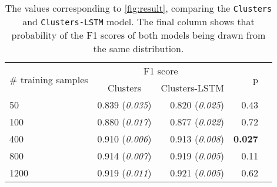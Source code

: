 \begin{table}[tb]
  \centering
  \begin{tabular}{lrrrr}
    \toprule
    \multirow{2}[3]{*}{\# training samples} & \multicolumn{2}{c}{F1 score} & \multirow{2}[3]{*}{p} \\
    \cmidrule(lr){2-3}
    & \multicolumn{1}{c}{Clusters} & \multicolumn{1}{c}{Clusters-LSTM} & \\
    \midrule
    50   & 0.839 (\emph{0.035}) & 0.820 (\emph{0.025}) & 0.43 \\
    100  & 0.880 (\emph{0.017}) & 0.877 (\emph{0.022}) & 0.72 \\
    400  & 0.910 (\emph{0.006}) & 0.913 (\emph{0.008}) & \textbf{0.027} \\
    800  & 0.914 (\emph{0.007}) & 0.919 (\emph{0.005}) & 0.11 \\
    1200 & 0.919 (\emph{0.011}) & 0.921 (\emph{0.005}) & 0.62 \\
    \bottomrule
  \end{tabular}
  \caption{The values corresponding to \cref{fig:result}, comparing the
    \texttt{Clusters} and \texttt{Clusters-LSTM} model. The final column shows
    that probability of the F1 scores of both models being drawn from the same
  distribution.\label{tbl:cl_cllstm}}
\end{table}

